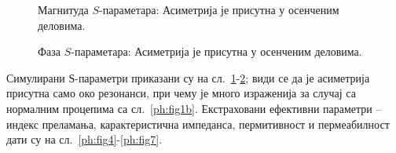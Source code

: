 \documentclass[main.tex]{subfiles}
\begin{document}
\begin{figure}[!t]
\centering
{}
\hfill%
\caption{Магнитуда $S$-параметара:  Асиметрија је присутна у осенченим деловима.}
\label{ph:fig2}
\end{figure} 

\begin{figure}[!t]
\centering
{}
\caption{Фаза $S$-параметара:  Асиметрија је присутна у осенченим деловима.}
\label{ph:fig3}
\end{figure} 
Симулирани $Ѕ$-параметри приказани су на сл.~\ref{ph:fig2}-\ref{ph:fig3}; види се да је асиметрија присутна само око резонанси, при чему је много израженија за случај са нормалним процепима са сл.~\ref{ph:fig1b}. Екстраховани ефективни параметри -- индекс преламања, карактеристична импеданса, пермитивност и пермеабилност дати су на сл.~\ref{ph:fig4}-\ref{ph:fig7}.
\end{document}
